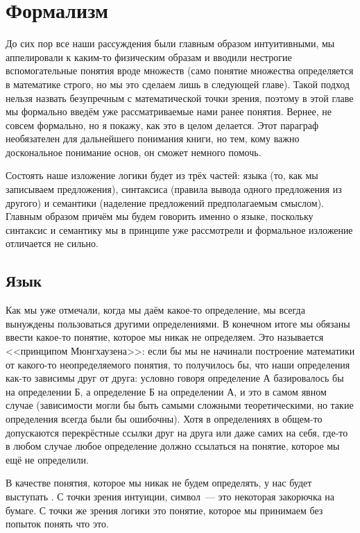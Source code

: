 \section{Формализм}

До сих пор все наши рассуждения были главным образом интуитивными, мы аппелировали к каким-то физическим образам и вводили нестрогие вспомогательные понятия вроде множеств (само понятие множества определяется в математике строго, но мы это сделаем лишь в следующей главе). Такой подход нельзя назвать безупречным с математической точки зрения, поэтому в этой главе мы формально введём уже рассматриваемые нами ранее понятия.  Вернее, не совсем формально, но я покажу, как это в целом делается. Этот параграф необязателен для дальнейшего понимания книги, но тем, кому важно доскональное понимание основ, он сможет немного помочь.

Состоять наше изложение логики будет из трёх частей: языка (то, как мы записываем предложения), синтаксиса (правила вывода одного предложения из другого) и семантики (наделение предложений предполагаемым смыслом). Главным образом причём мы будем говорить именно о языке, поскольку синтаксис и семантику мы в принципе уже рассмотрели и формальное изложение отличается не сильно.

\subsection{Язык}

Как мы уже отмечали, когда мы даём какое-то определение, мы всегда вынуждены пользоваться другими определениями. В конечном итоге мы обязаны ввести какое-то понятие, которое мы никак не определяем. Это называется <<принципом Мюнгхаузена>>: если бы мы не начинали построение математики от какого-то неопределяемого понятия, то получилось бы, что наши определения как-то зависимы друг от друга: условно говоря определение А базировалось бы на определении Б, а определение Б на определении А, и это в самом явном случае (зависимости могли бы быть самыми сложными теоретическими, но такие определения всегда были бы ошибочны). Хотя в определениях в общем-то допускаются перекрёстные ссылки друг на друга или даже самих на себя, где-то в любом случае любое определение должно ссылаться на понятие, которое мы ещё не определили.

В качестве понятия, которое мы никак не будем определять, у нас будет выступать . С точки зрения интуиции, символ~--- это некоторая закорючка на бумаге. С точки же зрения логики это понятие, которое мы принимаем без попыток понять что это.

